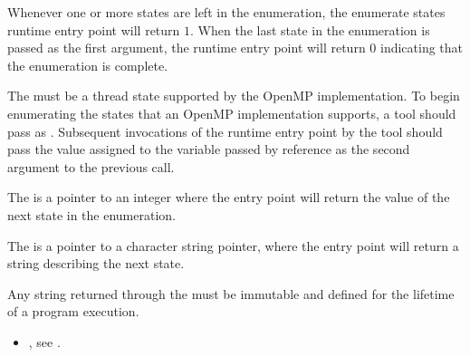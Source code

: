 Whenever one or more states are left in the enumeration,
the enumerate states runtime entry point will return $1$.
When the last state in the enumeration is passed
as the first argument, the runtime entry point will return $0$
indicating that the enumeration is complete.



\argdesc

The \callbackarg{}  must be a thread state
supported by the OpenMP implementation.  To begin enumerating the
states that an OpenMP implementation supports, a tool should pass
 as .  Subsequent
invocations of the runtime entry point by the tool should pass the
value assigned to the variable passed by reference as the second
argument to the previous call.

The \callbackarg{}  is a pointer to an integer where
the entry point will return the value of the next state in the
enumeration.

The \callbackarg{}  is a pointer to a
character string pointer, where the entry point will return a string
describing the next state.

\constraints
Any string returned through the \callbackarg{}
 must be immutable and defined
for the lifetime of a program execution.

\vspace{2ex}


\crossreferences
\begin{itemize}
\item {}, see .
\end{itemize}

